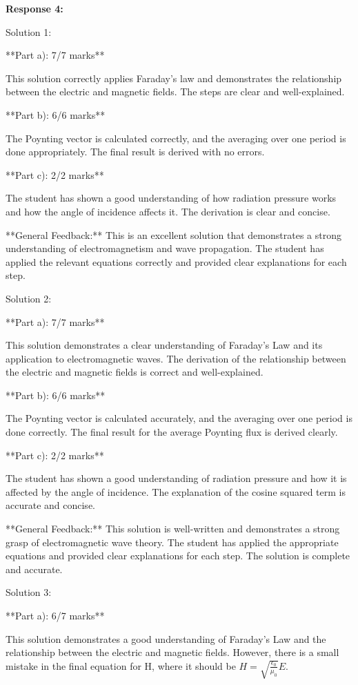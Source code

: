\documentclass[a4paper,11pt]{article}
\begin{document}
\bigskip    
\textbf{Response 4:}

Solution 1:

**Part a): 7/7 marks**

This solution correctly applies Faraday's law and demonstrates the relationship between the electric and magnetic fields. The steps are clear and well-explained.

**Part b): 6/6 marks**

The Poynting vector is calculated correctly, and the averaging over one period is done appropriately. The final result is derived with no errors.

**Part c): 2/2 marks**

The student has shown a good understanding of how radiation pressure works and how the angle of incidence affects it. The derivation is clear and concise.

**General Feedback:** This is an excellent solution that demonstrates a strong understanding of electromagnetism and wave propagation. The student has applied the relevant equations correctly and provided clear explanations for each step.

Solution 2:

**Part a): 7/7 marks**

This solution demonstrates a clear understanding of Faraday's Law and its application to electromagnetic waves. The derivation of the relationship between the electric and magnetic fields is correct and well-explained.

**Part b): 6/6 marks**

The Poynting vector is calculated accurately, and the averaging over one period is done correctly. The final result for the average Poynting flux is derived clearly.

**Part c): 2/2 marks**

The student has shown a good understanding of radiation pressure and how it is affected by the angle of incidence. The explanation of the cosine squared term is accurate and concise.

**General Feedback:** This solution is well-written and demonstrates a strong grasp of electromagnetic wave theory. The student has applied the appropriate equations and provided clear explanations for each step. The solution is complete and accurate.

Solution 3:

**Part a): 6/7 marks**

This solution demonstrates a good understanding of Faraday's Law and the relationship between the electric and magnetic fields. However, there is a small mistake in the final equation for H, where it should be \(H = \sqrt{\frac{\epsilon_{0}}{\mu_{0}}} E\).
\end{document}
